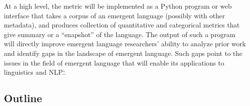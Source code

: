 At a high level, the metric will be implemented as a Python program or web interface that takes a corpus of an emergent language (possibly with other metadata), and produces collection of quantitative and categorical metrics that give summary or a ``snapshot'' of the language.
The output of such a program will directly improve emergent language researchers' ability to analyze prior work and identify gaps in the landscape of emergent language.
Such gaps point to the issues in the field of emergent language that will enable its applications to linguistics and NLP.\spacefactor\sfcode`.{}






\subsection*{Outline}

